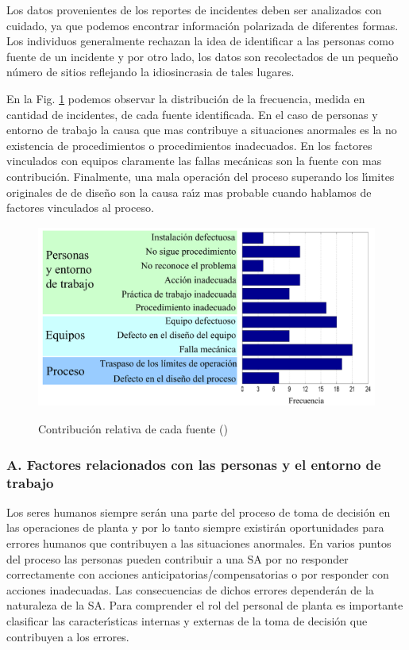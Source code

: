 Los datos provenientes de los reportes de incidentes deben ser analizados con cuidado, ya que podemos
encontrar informaci{\'o}n polarizada de diferentes formas. Los individuos generalmente rechazan la idea de
identificar a las personas como fuente de un incidente y por otro lado, los datos son recolectados de un
peque{\~n}o n{\'u}mero de sitios reflejando la idiosincrasia de tales lugares.

En la Fig. \ref{f0_2} podemos observar la distribuci{\'o}n de la frecuencia, medida en cantidad de incidentes,
de cada fuente identificada. En el caso de personas y entorno de trabajo la causa que mas contribuye a
situaciones anormales es la no existencia de procedimientos o procedimientos inadecuados. En los factores
vinculados con equipos claramente las fallas mec{\'a}nicas son la fuente con mas contribuci{\'o}n. Finalmente, una
mala operaci{\'o}n del proceso superando los l{\'\i}mites originales de de dise{\~n}o son la causa ra{\'\i}z mas probable
cuando hablamos de factores vinculados al proceso.
\begin{figure}[t]
  \centering
  \includegraphics[width=13cm,height=6cm]{Ch0/f0_2}\\
  \caption{Contribuci{\'o}n relativa de cada fuente (\cite{ASM}\textcolor{myblue}{\circledR})}\label{f0_2}
\end{figure}

\subsubsection{A. Factores relacionados con las personas y el entorno de trabajo}
Los seres humanos siempre ser{\'a}n una parte del proceso de toma de decisi{\'o}n en las operaciones de planta y por
lo tanto siempre existir{\'a}n oportunidades para errores humanos que contribuyen a las situaciones anormales.
En varios puntos del proceso las personas pueden contribuir a una SA por no responder correctamente con
acciones anticipatorias/compensatorias o por responder con acciones inadecuadas. Las consecuencias de dichos
errores depender{\'a}n de la naturaleza de la SA. Para comprender el rol del personal de planta es importante
clasificar las caracter{\'\i}sticas internas y externas de la toma de decisi{\'o}n que contribuyen a los errores.

